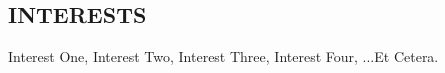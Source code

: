 \documentclass[margin]{res}
\begin{document}
\begin{resume}
\section{INTERESTS}
  Interest One, Interest Two, Interest Three, Interest Four, ...Et Cetera.
\end{resume}
\end{document}

